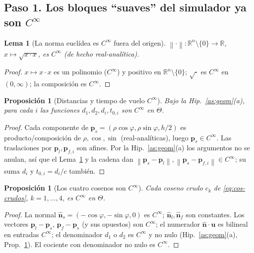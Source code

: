 \documentclass[11pt,a4paper]{article}
\theoremstyle{plain}
\newtheorem{lemma}[theorem]{Lema}
\newtheorem{proposition}[theorem]{Proposici\'on}
\theoremstyle{definition}
\newcommand{\vect}[1]{\boldsymbol{#1}}
\newcommand{\R}{\mathbb{R}}
\newcommand{\norm}[1]{\left\lVert #1 \right\rVert}
\begin{document}
\subsection*{Paso 1. Los bloques ``suaves'' del simulador ya son \texorpdfstring{$C^\infty$}{C-inf}}
\label{sec:reg-suaves}

\begin{lemma}[La norma eucl\'idea es $C^\infty$ fuera del origen]\label{lem:norm}
$\norm{\cdot}:\R^n\setminus\{0\}\to\R$, $x\mapsto\sqrt{x\cdot x}$, es $C^\infty$
(de hecho real-anal\'itica).
\end{lemma}
\begin{proof}
$x\mapsto x\cdot x$ es un polinomio ($C^\infty$) y positivo en
$\R^n\setminus\{0\}$; $\sqrt{\cdot}$ es $C^\infty$ en $(0,\infty)$; la
composici\'on es $C^\infty$.
\end{proof}

\begin{proposition}[Distancias y tiempo de vuelo $C^\infty$]\label{prop:dist}
Bajo la Hip.~\ref{as:geom}(a), para cada $i$ las funciones $d_1,d_2,d_i,t_{0,i}$
son $C^\infty$ en $\Theta$.
\end{proposition}
\begin{proof}
Cada componente de $\vect{p}_s=(\rho\cos\varphi,\rho\sin\varphi,h/2)$ es
producto/composici\'on de $\rho,\cos,\sin$ (real-anal\'iticas), luego
$\vect{p}_s\in C^\infty$. Las traslaciones por $\vect{p}_l,\vect{p}_{f,i}$ son
afines. Por la Hip.~\ref{as:geom}(a) los argumentos no se anulan, as\'i que el
Lema~\ref{lem:norm} y la cadena dan $\norm{\vect{p}_s-\vect{p}_l},
\norm{\vect{p}_s-\vect{p}_{f,i}}\in C^\infty$; su suma $d_i$ y $t_{0,i}=d_i/c$
tambi\'en.
\end{proof}

\begin{proposition}[Los cuatro cosenos son $C^\infty$]\label{prop:cos}
Cada coseno crudo $c_k$ de \eqref{eq:cos-crudos},
$k=1,\dots,4$, es $C^\infty$ en $\Theta$.
\end{proposition}
\begin{proof}
La normal $\hat{\vect n}_s=(-\cos\varphi,-\sin\varphi,0)$ es $C^\infty$;
$\hat{\vect n}_l,\hat{\vect n}_f$ son constantes. Los vectores $\vect p_l-\vect
p_s$, $\vect p_f-\vect p_s$ (y sus opuestos) son $C^\infty$; el numerador
$\hat{\vect n}\!\cdot\!\vect u$ es bilineal en entradas $C^\infty$; el denominador
$d_1$ o $d_2$ es $C^\infty$ y no nulo (Hip.~\ref{as:geom}(a),
Prop.~\ref{prop:dist}). El cociente con denominador no nulo es $C^\infty$.
\end{proof}
\end{document}
